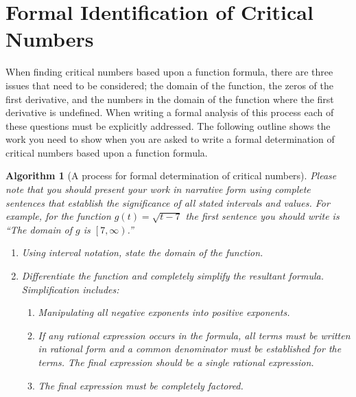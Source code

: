 \documentclass[10pt,oneside,]{book}
\theoremstyle{plain}
\newtheorem{algorithm}[theorem]{Algorithm}
\theoremstyle{definition}
\numberwithin{equation}{section}
\newcommand{\fe}[2]{#1\mathopen{}\left(#2\right)\mathclose{}}
\newcommand{\cointerval}[2]{\left[\left.#1,#2\right)\right.}
\begin{document}
\section[Formal ID of Critical Numbers]{Formal Identification of Critical Numbers}\label{section-formal-identification-of-critical-numbers}
When finding critical numbers based upon a function formula, there are three issues that need to be considered; the domain of the function, the zeros of the first derivative, and the numbers in the domain of the function where the first derivative is undefined.  When writing a formal analysis of this process each of these questions must be explicitly addressed.  The following outline shows the work you need to show when you are asked to write a formal determination of critical numbers based upon a function formula.%
\begin{algorithm}[A process for formal determination of critical numbers]\label{algorithm-find-critical-numbers}
Please note that you should present your work in narrative form using complete sentences that establish the significance of all stated intervals and values.  For example, for the function \(\fe{g}{t}=\sqrt{t-7}\) the first sentence you should write is ``The domain of \(g\) is \(\cointerval{7}{\infty}\).''%
\begin{enumerate}
\item{}Using interval notation, state the domain of the function.\item{}Differentiate the function and completely simplify the resultant formula.  Simplification includes:
                    \begin{enumerate}
\item{}Manipulating all negative exponents into positive exponents.\item{}If any rational expression occurs in the formula, all terms must be written in rational form and a common denominator must be established for the terms.  The final expression should be a single rational expression.\item{}The final expression must be completely factored.\end{enumerate}


\end{enumerate}
\end{algorithm}
\end{document}
